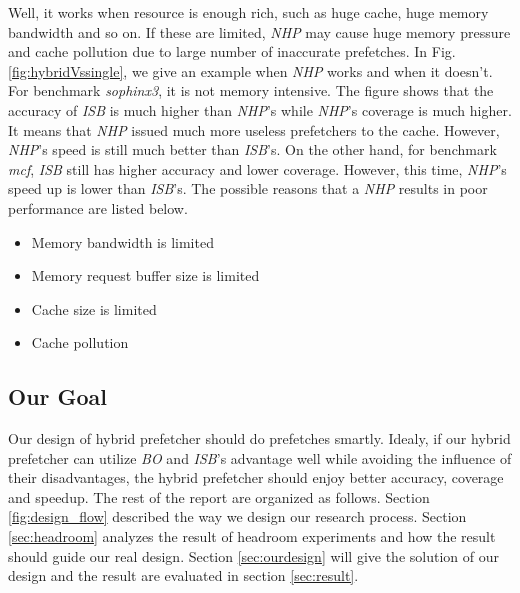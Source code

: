   Well, it works when resource is enough rich, such as huge cache, huge memory bandwidth and so on. If these are limited, \emph{NHP} may cause huge memory pressure and cache pollution due to large number of inaccurate prefetches. In Fig.\ref{fig:hybridVssingle}, we give an example when \emph{NHP} works and when it doesn't. For benchmark \emph{sophinx3}, it is not memory intensive. The figure shows that the accuracy of \emph{ISB} is much higher than \emph{NHP}'s while \emph{NHP}'s coverage is much higher. It means that \emph{NHP} issued much more useless prefetchers to the cache. However, \emph{NHP}'s speed is still much better than \emph{ISB}'s. On the other hand, for benchmark \emph{mcf}, \emph{ISB} still has higher accuracy and lower coverage. However, this time, \emph{NHP}'s speed up is lower than \emph{ISB}'s. The possible reasons that a \emph{NHP} results in poor performance are listed below.

  \begin{itemize}
    \item Memory bandwidth is limited
    \item Memory request buffer size is limited
    \item Cache size is limited
    \item Cache pollution
  \end{itemize}

  \subsection{Our Goal}
  \label{sec:goal}
  Our design of hybrid prefetcher should do prefetches smartly. Idealy, if our hybrid prefetcher can utilize \emph{BO} and \emph{ISB}'s advantage well while avoiding the influence of their disadvantages, the hybrid prefetcher should enjoy better accuracy, coverage and speedup. The rest of the report are organized as follows. Section \ref{fig:design_flow} described the way we design our research process. Section \ref{sec:headroom} analyzes the result of headroom experiments and how the result should guide our real design. Section \ref{sec:ourdesign} will give the solution of our design and the result are evaluated in section \ref{sec:result}.
